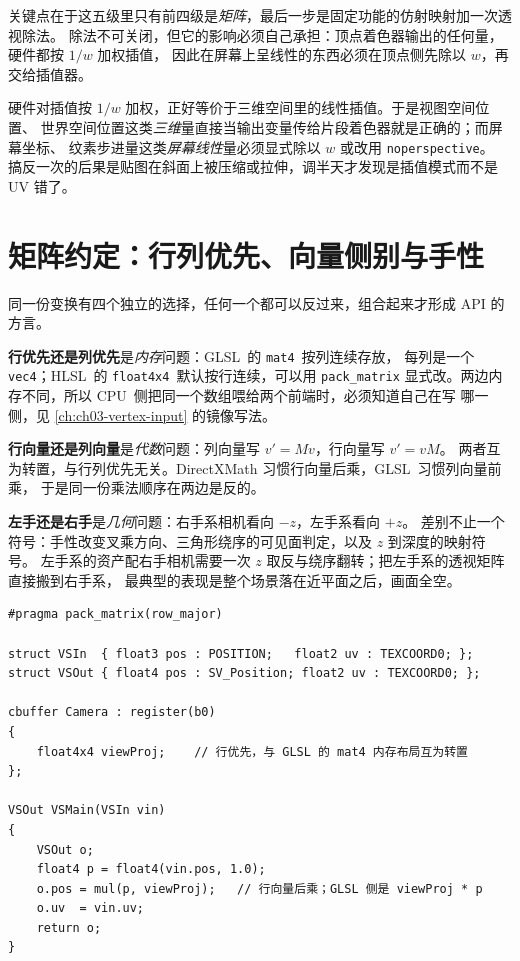 \documentclass[12pt,a4paper,fontset=fandol]{ctexbook}
\newcommand{\Tp}[1]{\texttt{#1}}
\newcommand{\Bk}{\discretionary{}{}{}}
\newcommand{\Lang}[1]{\textsf{#1}}
\newcommand{\DomCPU}{\Lang{CPU}}
\newcommand{\GSL}{\Lang{GLSL}}
\newcommand{\HSL}{\Lang{HLSL}}
\begin{document}
关键点在于这五级里只有前四级是\emph{矩阵}，最后一步是固定功能的仿射映射加一次透视除法。
除法不可关闭，但它的影响必须自己承担：顶点着色器输出的任何量，硬件都按 $1/w$ 加权插值，
因此在屏幕上呈线性的东西必须在顶点侧先除以 $w$，再交给插值器。

\begin{note}[title={谁在做除法}]
  硬件对插值按 $1/w$ 加权，正好等价于三维空间里的线性插值。于是视图空间位置、
  世界空间位置这类\emph{三维}量直接当输出变量传给片段着色器就是正确的；而屏幕坐标、
  纹素步进量这类\emph{屏幕线性}量必须显式除以 $w$ 或改用 \Tp{noperspective}。
  搞反一次的后果是贴图在斜面上被压缩或拉伸，调半天才发现是插值模式而不是 UV 错了。
\end{note}

\section{矩阵约定：行列优先、向量侧别与手性}

同一份变换有四个独立的选择，任何一个都可以反过来，组合起来才形成 API 的方言。

\textbf{行优先还是列优先}是\emph{内存}问题：\GSL\ 的 \Tp{mat4}\ 按列连续存放，
每列是一个 \Tp{vec4}；\HSL\ 的 \Tp{float4x4}\ 默认按行连续，可以用 \Tp{pack\_\Bk matrix}
显式改。两边内存不同，所以 \DomCPU\ 侧把同一个数组喂给两个前端时，必须知道自己在写
哪一侧，见 \ref{ch:ch03-vertex-input} 的镜像写法。

\textbf{行向量还是列向量}是\emph{代数}问题：列向量写 $v' = Mv$，行向量写 $v' = vM$。
两者互为转置，与行列优先无关。DirectXMath 习惯行向量后乘，\GSL\ 习惯列向量前乘，
于是同一份乘法顺序在两边是反的。

\textbf{左手还是右手}是\emph{几何}问题：右手系相机看向 $-z$，左手系看向 $+z$。
差别不止一个符号：手性改变叉乘方向、三角形绕序的可见面判定，以及 $z$ 到深度的映射符号。
左手系的资产配右手相机需要一次 $z$ 取反与绕序翻转；把左手系的透视矩阵直接搬到右手系，
最典型的表现是整个场景落在近平面之后，画面全空。

\begin{lstlisting}[style=hlslstyle,caption={HLSL 的行优先与行向量写法：与 GLSL 的列优先前乘互为转置},label={lst:ch04-hlsl-rowmajor}]
#pragma pack_matrix(row_major)

struct VSIn  { float3 pos : POSITION;   float2 uv : TEXCOORD0; };
struct VSOut { float4 pos : SV_Position; float2 uv : TEXCOORD0; };

cbuffer Camera : register(b0)
{
    float4x4 viewProj;    // 行优先，与 GLSL 的 mat4 内存布局互为转置
};

VSOut VSMain(VSIn vin)
{
    VSOut o;
    float4 p = float4(vin.pos, 1.0);
    o.pos = mul(p, viewProj);   // 行向量后乘；GLSL 侧是 viewProj * p
    o.uv  = vin.uv;
    return o;
}
\end{lstlisting}
\end{document}

